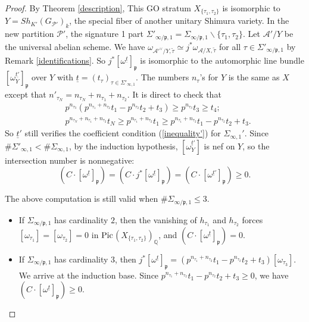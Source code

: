 \documentclass{article}
\begin{document}
\begin{proof}
By Theorem \ref{description}, This GO stratum $X_{\{\tau_1,\tau_2\}}$ is isomorphic to $Y=Sh_{K'}(G_{\mathcal{P}'})_k$, the special fiber of another unitary Shimura variety. In the new partition $\mathcal{P}'$, the signature 1 part $\Sigma'_{\infty/\mathfrak{p},1}=\Sigma_{\infty/\mathfrak{p},1}\backslash \{\tau_1,\tau_2\}$. Let $\mathcal{A'}/Y$ be the universal abelian scheme. We have $\omega_{\mathcal{A}'^\vee/Y,\tilde\tau}\simeq j^\ast\omega_{\mathcal{A}/X,\tilde\tau}$ for all $\tau\in\Sigma'_{\infty/\mathfrak{p},1}$ by Remark \ref{identifications}. So $j^\ast[\omega^{\underline t}]_{\mathfrak{p}}$ is isomorphic to the automorphic line bundle $[\omega_Y^{\underline{t'}}]_{\mathfrak{p}}$ over $Y$ with $\underline t=(t_\tau)_{\tau\in\Sigma'_{\infty,1}}$. The numbers $n_\tau$'s for $Y$ is the same as $X$ except that $n'_{\tau_N}=n_{\tau_N}+n_{\tau_1}+n_{\tau_2}$. It is direct to check that
\begin{equation}
\begin{aligned}
&p^{n_{\tau_3}}(p^{n_{\tau_1}+n_{\tau_2}}t_1-p^{n_{\tau_2}}t_2+t_3)\ge p^{n_{\tau_3}}t_3\ge t_4; \\
&p^{n_{\tau_N}+n_{\tau_1}+n_{\tau_2}}t_N\ge p^{n_{\tau_1}+n_{\tau_2}}t_1\ge p^{n_{\tau_1}+n_{\tau_2}}t_1-p^{n_{\tau_2}}t_2+t_3.
\end{aligned}
\end{equation}
So $\underline{t}'$ still verifies the coefficient condition (\ref{inequality'}) for $\Sigma_{\infty,1}'$. Since $\#\Sigma'_{\infty,1}<\#\Sigma_{\infty,1}$, by the induction hypothesis, $[\omega_Y^{\underline{t}'}]$ is nef on $Y$, so the intersection number is nonnegative:
\begin{equation}
(C\cdot [\omega^{\underline{t}}]_{\mathfrak{p}})=(C\cdot j^\ast[\omega^{\underline{t}}]_{\mathfrak{p}})=(C\cdot [\omega^{\underline{t}'}]_{\mathfrak{p}})\ge0.
\end{equation}


\begin{remark} The above computation is still valid when $\#\Sigma_{\infty/\mathfrak{p},1}\le3$.
\begin{itemize}
	\item If $\Sigma_{\infty/\mathfrak{p},1}$ has cardinality $2$, then the vanishing of $h_{\tau_1}$ and $h_{\tau_2}$ forces $[\omega_{\tau_1}]=[\omega_{\tau_2}]=0$ in $\rm Pic$$(X_{\{\tau_1,\tau_2\}})_{\mathbb{Q}}$, and $(C\cdot [\omega^{\underline{t}}]_{\mathfrak{p}})=0$.
	\item If $\Sigma_{\infty/\mathfrak{p},1}$ has cardinality $3$, then $j^\ast[\omega^{\underline{t}}]_{\mathfrak{p}}=(p^{n_{\tau_1}+n_{\tau_2}}t_1-p^{n_{\tau_2}}t_2+t_3)[\omega_{\tau_3}]$. We arrive at the induction base. Since $p^{n_{\tau_1}+n_{\tau_2}}t_1-p^{n_{\tau_2}}t_2+t_3\ge0$, we have $(C\cdot [\omega^{\underline t}]_{\mathfrak{p}})\ge0$.
\end{itemize}
\end{remark}





\end{proof}
\end{document}
